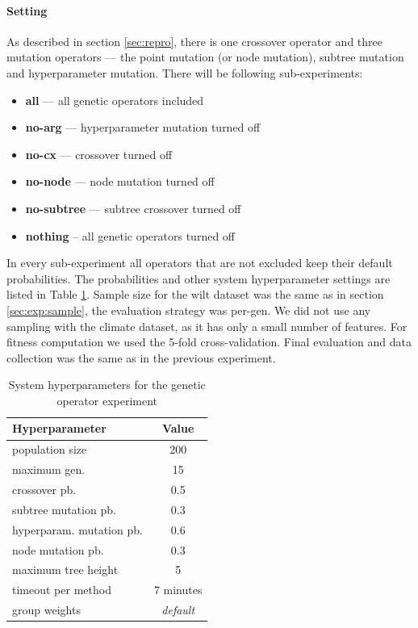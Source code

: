 \paragraph{Setting}

As described in section \ref{sec:repro}, there is one crossover operator and
three mutation operators --- the point mutation (or node mutation), subtree
mutation and hyperparameter
mutation. There will be following sub-experiments:
\begin{itemize}
\setlength\itemsep{0.3em}
\item \textbf{all} --- all genetic operators included
\item \textbf{no-arg} --- hyperparameter mutation turned off
\item \textbf{no-cx} --- crossover turned off
\item \textbf{no-node} --- node mutation turned off
\item \textbf{no-subtree} --- subtree crossover turned off
\item \textbf{nothing} -- all genetic operators turned off
\end{itemize}
In every sub-experiment all operators that are not excluded keep their default
probabilities. The probabilities and other system hyperparameter
settings are listed in Table \ref{tab04:exp2:setting}.
Sample size for the wilt dataset was the same as in section
\ref{sec:exp:sample}, the evaluation strategy was per-gen. We did not use any
sampling with the climate dataset, as it has only a small number of features.
For fitness computation we used the 5-fold cross-validation. Final evaluation
and data collection was the same as in the previous experiment.

\begin{table}[ht]
\centering
\caption{System hyperparameters for the genetic operator experiment}\label{tab04:exp2:setting}
\begin{tabular}{l c}
\toprule
\textbf{\upshape Hyperparameter} & \textbf{Value} \\
\midrule
population size & 200 \\
maximum gen. & 15 \\
crossover pb. & 0.5 \\
subtree mutation pb. & 0.3 \\
hyperparam. mutation pb. & 0.6 \\
node mutation pb. & 0.3 \\
maximum tree height & 5 \\
timeout per method  & 7 minutes \\
group weights & \textit{default} \\
\bottomrule

\end{tabular}

\end{table}

